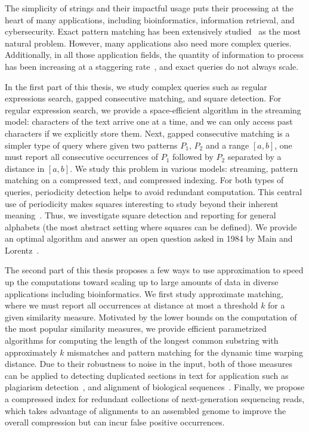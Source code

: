 The simplicity of strings and their impactful usage puts their processing at the heart of many applications, including bioinformatics, information retrieval, and cybersecurity. Exact pattern matching has been extensively studied~\cite{charras2004handbook} as the most natural problem. However, many applications also need more complex queries. Additionally, in all those application fields, the quantity of information to process has been increasing at a staggering rate~\cite{muir2016real}, and exact queries do not always scale.

In the first part of this thesis, we study complex queries such as regular expressions search, gapped consecutive matching, and square detection. 
For regular expression search, we provide a space-efficient algorithm in the streaming model: characters of the text arrive one at a time, and we can only access past characters if we explicitly store them. 
Next, gapped consecutive matching is a simpler type of query where given two patterns $P_1$, $P_2$ and a range $[a,b]$, one must report all consecutive occurrences of $P_1$ followed by $P_2$ separated by a distance in $[a,b]$. We study this problem in various models: streaming, pattern matching on a compressed text, and compressed indexing.
For both types of queries, periodicity detection helps to avoid redundant computation. This central use of periodicity makes squares interesting to study beyond their inherent meaning~\cite{Kolpakov2003}. Thus, we investigate square detection and reporting for general alphabets (the most abstract setting where squares can be defined). We provide an optimal algorithm and answer an open question asked in 1984 by Main and Lorentz~\cite{Main1984}.

The second part of this thesis proposes a few ways to use approximation to speed up the computations toward scaling up to large amounts of data in diverse applications including bioinformatics.
We first study approximate matching, where we must report all occurrences at distance at most a threshold $k$ for a given similarity measure. Motivated by the lower bounds on the computation of the most popular similarity measures, we provide efficient parametrized algorithms for computing the length of the longest common substring with approximately $k$ mismatches and pattern matching for the dynamic time warping distance.
Due to their robustness to noise in the input, both of those measures can be applied to detecting duplicated sections in text for application such as plagiarism detection~\cite{zou2010cluster}, and alignment of biological sequences~\cite{leimeister2014kmacs,loose2016real,han2018accurate}.
Finally, we propose a compressed index for redundant collections of next-generation sequencing reads, which takes advantage of alignments to an assembled genome to improve the overall compression but can incur false positive occurrences.

